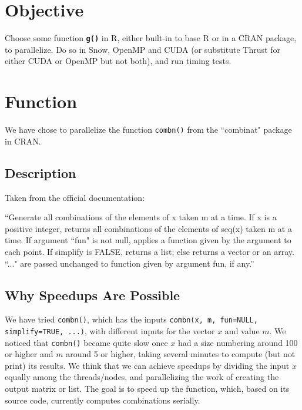 \documentclass[12pt]{article}
\begin{document}
\raggedright{



\tableofcontents

\newpage


\section{Objective}
Choose some function \textbf{\texttt{g()}} in R, either built-in to base R or in a CRAN package, to parallelize. Do so in Snow, OpenMP and CUDA (or substitute Thrust for either CUDA or OpenMP but not both), and run timing tests.

\section{Function}
We have chose to parallelize the function \texttt{combn()} from the ``combinat" package in CRAN.
\subsection{Description}
Taken from the official documentation:\cite{crandoc}\\
\null
\begin{adjustwidth}{2em}{0pt}
``Generate all combinations of the elements of x taken m at a time. If x is a positive integer, returns
all combinations of the elements of seq(x) taken m at a time. If argument ``fun" is not null, applies
a function given by the argument to each point. If simplify is FALSE, returns a list; else returns a
vector or an array. ``..." are passed unchanged to function given by argument fun, if any.''
\end{adjustwidth}

\subsection{Why Speedups Are Possible}

We have tried \texttt{combn()}, which has the inputs \texttt{combn(x, m, fun=NULL, simplify=TRUE, ...)}, with different inputs for the vector $x$ and value $m$. We noticed that \texttt{combn()} became quite slow once $x$ had a size numbering around 100 or higher and $m$ around 5 or higher, taking several minutes to compute (but not print) its results. We think that we can achieve speedups by dividing the input $x$ equally among the threads/nodes, and parallelizing the work of creating the output matrix or list. The goal is to speed up the function, which, based on its source code, currently computes combinations serially.    

}
\end{document}

